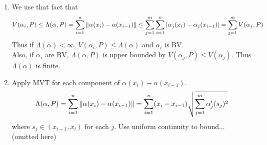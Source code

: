 \begin{enumerate}
	\item We use that fact that $$\begin{aligned}
		 V(\alpha_i, P) \leq \Lambda(\alpha, P) = \sum_{i=1}^n \left\lVert\alpha(x_i) - \alpha(x_{i-1})\right\rVert \leq \sum_{j=1}^m \sum_{i=1}^n \left|\alpha_j (x_i) - \alpha_j(x_{i-1})\right| = \sum_{j=1}^m V(\alpha_j, P)
	\end{aligned}
	$$
	Thus if $\Lambda(\alpha) <\infty$, $V(\alpha_i, P)\leq \Lambda(\alpha)$ and $\alpha_i$ is BV.\\
	Also, if $\alpha_i$ are BV, $\Lambda(\alpha, P)$ is upper bounded by $V(\alpha_j, P) \leq V(\alpha_j)$. Thus $\Lambda(\alpha)$ is finite.
	\item Apply MVT for each component of $\alpha(x_i) - \alpha(x_{i-1})$.
	$$\Lambda(\alpha, P) = \sum_{i=1}^n \left\lVert\alpha(x_i) - \alpha(x_{i-1})\right\rVert = \sum_{i=1}^n (x_i-x_{i-1}) \sqrt{\sum_{j=1}^m \alpha'_j(s_j)^2}$$
	where $s_j \in (x_{i-1}, x_i)$ for each $j$. Use uniform continuity to bound... (omitted here)
\end{enumerate}
\pagebreak